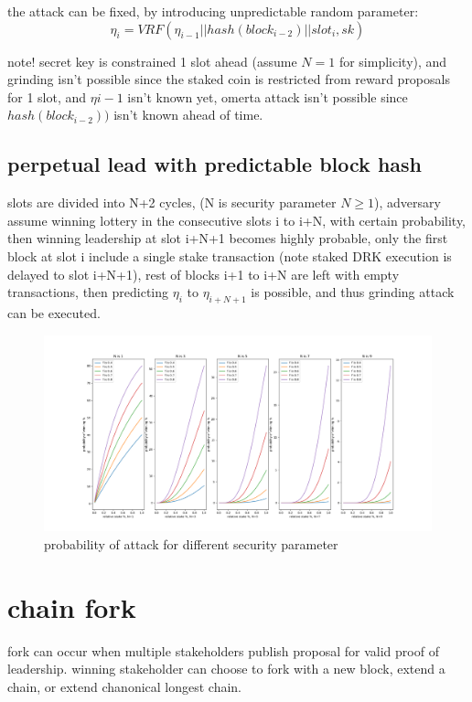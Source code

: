 \documentclass{article}
\begin{document}
the attack can be fixed, by introducing unpredictable random parameter: $$\eta_i = VRF(\eta_{i-1}||hash(block_{i-2})||slot_i, sk)$$


note! secret key is constrained 1 slot ahead (assume $N=1$ for simplicity), and grinding isn't possible since the staked coin is restricted from reward proposals for 1 slot, and $\eta{i-1}$ isn't known yet, omerta attack isn't possible since $hash(block_{i-2}))$ isn't known ahead of time.

\subsection {perpetual lead with predictable block hash}



slots are divided into N+2 cycles, (N is security parameter $N \ge 1$), adversary assume winning lottery in the consecutive slots i to i+N, with certain probability, then winning leadership at slot i+N+1 becomes highly probable, only the first block at slot i include a single stake transaction (note staked DRK execution is delayed to slot i+N+1), rest of blocks i+1 to i+N are left with empty transactions, then predicting $\eta_i$ to $\eta_{i+N+1}$ is possible, and thus grinding attack can be executed.

\begin{figure}
  \includegraphics[width=1.4\textwidth,left]{prob.png}
  \caption{probability of attack for different security parameter}
\end{figure}



\section{chain fork}
fork can occur when multiple stakeholders publish proposal for valid proof of leadership.
winning stakeholder can choose to fork with a new block, extend a chain, or extend chanonical longest chain.
\end{document}
